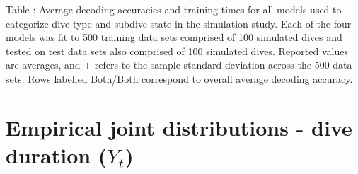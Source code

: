 \documentclass{article}
\begin{document}
        \noindent Table : Average decoding accuracies and training times for all models used to categorize dive type and subdive state in the simulation study. Each of the four models was fit to 500 training data sets comprised of 100 simulated dives and tested on test data sets also comprised of 100 simulated dives. Reported values are averages, and $\pm$ refers to the sample standard deviation across the 500 data sets. Rows labelled Both/Both correspond to overall average decoding accuracy.
        \addtocounter{tablenum}{1}

    \newpage
    \section{Empirical joint distributions - dive duration ($Y_t$)}
\end{document}
